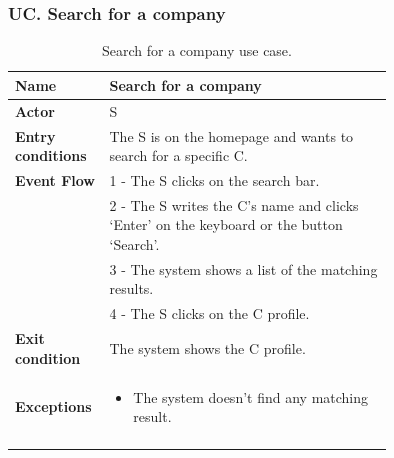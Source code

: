 \subsubsection*{UC\cuc . Search for a company}
\begin{center}
    \begin{longtable}{|l|p{0.75\linewidth}|}
        \hline
        \textbf{Name}               & Search for a company\\
        \hline
        \textbf{Actor}              & S\\
        \hline
        \textbf{Entry conditions}   & The S is on the homepage and wants to search for a specific C.\\
        \hline
        \textbf{Event Flow}         & 1 - The S clicks on the search bar. \\
        & 2 - The S writes the C’s name and clicks ‘Enter’ on the keyboard or the button ‘Search’. \\
        & 3 - The system shows a list of the matching results. \\
        & 4 - The S clicks on the C profile. \\
        \hline
        \textbf{Exit condition}   & The system shows the C profile. \\       
        \hline
        \textbf{Exceptions}       & \begin{itemize}
            \item The system doesn't find any matching result.
        \end{itemize}\\
        \hline
        \caption{Search for a company use case.}
        \label{tab: search_for_a_company_use_case}
    \end{longtable}
\end{center}



